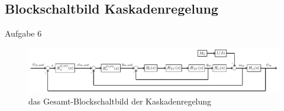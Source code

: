\documentclass[AMdocument,optGerman]{AMlatex}%
\begin{document}
\subsection{Blockschaltbild Kaskadenregelung}
Aufgabe 6
\begin{figure}[htb]%
	\centering%
	\includegraphics[width=140mm]{Kaskadenregelung}\par%
	\caption{das Gesamt-Blockschaltbild der Kaskadenregelung}%
	\label{fig:MyImage}%
\end{figure}%
\end{document}
